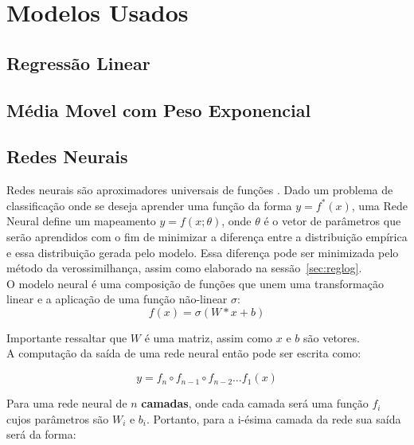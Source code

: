

\section{Modelos Usados} 



\subsection{ Regressão Linear}


\subsection{Média Movel com Peso Exponencial}



\subsection{Redes Neurais}

\label{sec:nn}
Redes neurais são aproximadores universais de funções \citep{nnuni}. Dado um problema
de classificação onde se deseja aprender uma função da forma $y = f^*(x)$, uma
Rede Neural define um mapeamento $y = f(x ; \theta)$, onde $\theta$ é o vetor de
parâmetros que serão aprendidos com o fim de minimizar a diferença entre a
distribuição empírica e essa distribuição gerada pelo modelo. Essa diferença pode
ser minimizada pelo método da verossimilhança, assim como elaborado na sessão~\ref{sec:reglog}.\\

O modelo neural é uma composição de funções que unem uma transformação linear e
a aplicação de uma função não-linear $\sigma$: \\

\[ f(x)=  \sigma(W*x + b) \]

Importante ressaltar que $W$ é uma matriz, assim como $x$ e $b$ são vetores. \\

A computação da saída de uma rede neural então pode ser escrita como:

\[   y = f_n \circ f_{n-1} \circ f_{n-2} \dots f_1(x)  \]

Para uma rede neural de $n$ \textbf{camadas}, onde cada camada será uma função
$f_i$ cujos parâmetros são $W_i$ e $b_i$. Portanto, para a i-ésima camada da rede
sua saída será da forma: 

